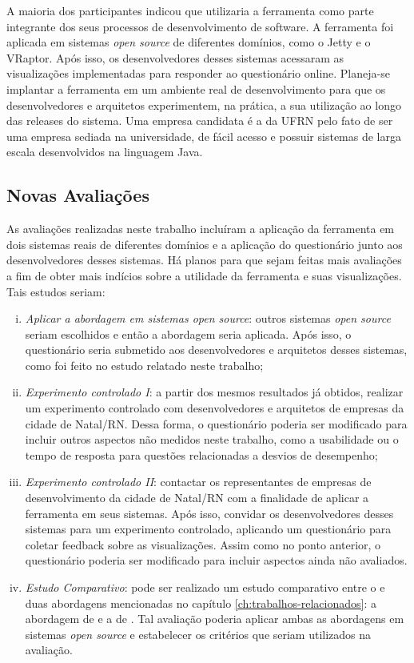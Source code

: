 A maioria dos participantes indicou que utilizaria a ferramenta como parte integrante dos seus processos de desenvolvimento de software. A ferramenta foi aplicada em sistemas \textit{open source} de diferentes domínios, como o Jetty e o VRaptor. Após isso, os desenvolvedores desses sistemas acessaram as visualizações implementadas para responder ao questionário online. Planeja-se implantar a ferramenta em um ambiente real de desenvolvimento para que os desenvolvedores e arquitetos experimentem, na prática, a sua utilização ao longo das releases do sistema. Uma empresa candidata é a da UFRN pelo fato de ser uma empresa sediada na universidade, de fácil acesso e possuir sistemas de larga escala desenvolvidos na linguagem Java.

\subsection{Novas Avaliações}

As avaliações realizadas neste trabalho incluíram a aplicação da ferramenta em dois sistemas reais de diferentes domínios e a aplicação do questionário junto aos desenvolvedores desses sistemas. Há planos para que sejam feitas mais avaliações a fim de obter mais indícios sobre a utilidade da ferramenta e suas visualizações. Tais estudos seriam:
\begin{enumerate}[(i)]
	\item \textit{Aplicar a abordagem em sistemas open source}: outros sistemas \textit{open source} seriam escolhidos e então a abordagem seria aplicada. Após isso, o questionário seria submetido aos desenvolvedores e arquitetos desses sistemas, como foi feito no estudo relatado neste trabalho;
	\item \textit{Experimento controlado I}: a partir dos mesmos resultados já obtidos, realizar um experimento controlado com desenvolvedores e arquitetos de empresas da cidade de Natal/RN. Dessa forma, o questionário poderia ser modificado para incluir outros aspectos não medidos neste trabalho, como a usabilidade ou o tempo de resposta para questões relacionadas a desvios de desempenho;
	\item \textit{Experimento controlado II}: contactar os representantes de empresas de desenvolvimento da cidade de Natal/RN com a finalidade de aplicar a ferramenta em seus sistemas. Após isso, convidar os desenvolvedores desses sistemas para um experimento controlado, aplicando um questionário para coletar feedback sobre as visualizações. Assim como no ponto anterior, o questionário poderia ser modificado para incluir aspectos ainda não avaliados.
	\item \textit{Estudo Comparativo}: pode ser realizado um estudo comparativo entre o \textit{\toolName} e duas abordagens mencionadas no capítulo \ref{ch:trabalhos-relacionados}: a abordagem de \citeauthor{SandovalAlcocer2013} e a de \citeauthor{Bergel}. Tal avaliação poderia aplicar ambas as abordagens em sistemas \textit{open source} e estabelecer os critérios que seriam utilizados na avaliação.
\end{enumerate}

